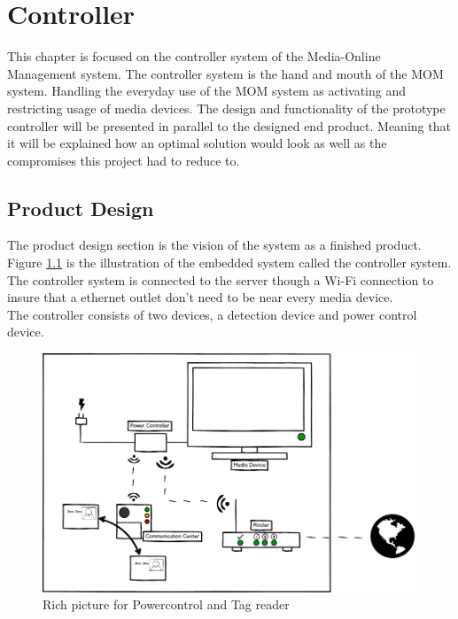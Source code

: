 \chapter{Controller}
\label{chap:controller}
This chapter is focused on the controller system of the Media-Online Management system. The controller system is the hand and mouth of the MOM system. Handling the everyday use of the MOM system as activating and restricting usage of media devices.\newline
The design and functionality of the prototype controller will be presented in parallel to the designed end product. Meaning that it will be explained how an optimal solution would look as well as the compromises this project had to reduce to.\newline

\section{Product Design}

The product design section is the vision of the system as a finished product. Figure \ref{fig:Power&Tagdevice} is the illustration of the embedded system called the controller system. The controller system is connected to the server though a Wi-Fi connection to insure that a ethernet outlet don't need to be near every media device. \\ 
The controller consists of two devices, a detection device and power control device.

\begin{figure}[!h]
	\centering
		\includegraphics[width=1.00\textwidth]{images/Power&Tagdevice.png}
	\caption{Rich picture for Powercontrol and Tag reader}
	\label{fig:Power&Tagdevice}
\end{figure}

